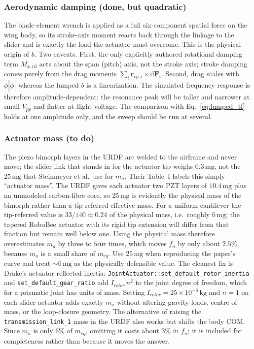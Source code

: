 \documentclass{article}
\newcommand{\D}{\mathrm{d}}
\begin{document}
\subsubsection{Aerodynamic damping (done, but quadratic)}
The blade-element wrench is applied as a full six-component spatial force on the wing body, so its stroke-axis moment reacts back through the linkage to the slider and is exactly the load the actuator must overcome. This is the physical origin of \(b\). Two caveats. First, the only explicitly authored rotational damping term \(M_{x,\mathrm{rd}}\) acts about the span (pitch) axis, not the stroke axis; stroke damping comes purely from the drag moments \(\sum_i \mathbf{r}_{cp,i}\times\D\mathbf{F}_i\). Second, drag scales with \(\dot{\phi}|\dot{\phi}|\) whereas the lumped \(b\) is a linearization. The simulated frequency response is therefore amplitude-dependent: the resonance peak will be taller and narrower at small \(V_{pp}\) and flatter at flight voltage. The comparison with Eq.~\eqref{eq:lumped_tf} holds at one amplitude only, and the sweep should be run at several.

\subsubsection{Actuator mass (to do)}
The piezo bimorph layers in the URDF are welded to the airframe and never move; the slider link that stands in for the actuator tip weighs \(0.3\,\mathrm{mg}\), not the \(25\,\mathrm{mg}\) that Steinmeyer et al.\ use for \(m_a\). Their Table~I labels this simply ``actuator mass''. The URDF gives each actuator two PZT layers of \(10.4\,\mathrm{mg}\) plus an unmodeled carbon-fibre core, so \(25\,\mathrm{mg}\) is evidently the physical mass of the bimorph rather than a tip-referred effective mass. For a uniform cantilever the tip-referred value is \(33/140 \approx 0.24\) of the physical mass, i.e.\ roughly \(6\,\mathrm{mg}\); the tapered RoboBee actuator with its rigid tip extension will differ from that fraction but remain well below one. Using the physical mass therefore overestimates \(m_a\) by three to four times, which moves \(f_n\) by only about \(2.5\%\) because \(m_a\) is a small share of \(m_{eq}\). Use \(25\,\mathrm{mg}\) when reproducing the paper's curve and treat \(\sim 6\,\mathrm{mg}\) as the physically defensible value. The cleanest fix is Drake's actuator reflected inertia: \texttt{JointActuator::set\_default\_rotor\_inertia} and \texttt{set\_default\_gear\_ratio} add \(I_{rotor}\,n^2\) to the joint degree of freedom, which for a prismatic joint has units of mass. Setting \(I_{rotor} = 25\times 10^{-6}\,\mathrm{kg}\) and \(n = 1\) on each slider actuator adds exactly \(m_a\) without altering gravity loads, centre of mass, or the loop-closure geometry. The alternative of raising the \texttt{transmission\_link\_1} mass in the URDF also works but shifts the body COM. Since \(m_a\) is only \(6\%\) of \(m_{eq}\), omitting it costs about \(3\%\) in \(f_n\); it is included for completeness rather than because it moves the answer.
\end{document}
